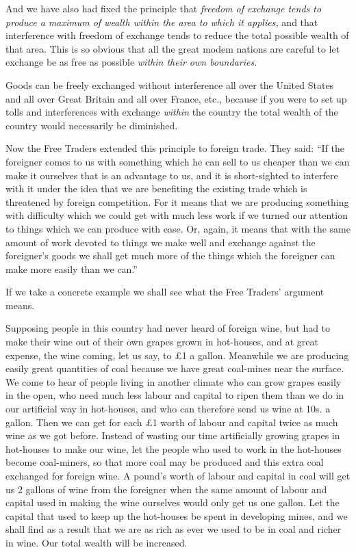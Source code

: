 \documentclass{book}
\begin{document}
And we have also had fixed the principle that \emph{freedom of exchange tends to produce a maximum of wealth within the area to which it applies,} and that interference with freedom of exchange tends to reduce the total possible wealth of that area. This is so obvious that all the great modem nations are careful to let exchange be as free as possible \emph{within their own boundaries.}

Goods can be freely exchanged without interference all over the United States and all over Great Britain and all over France, etc., because if you were to set up tolls and interferences with exchange \emph{within} the country the total wealth of the country would necessarily be diminished.

Now the Free Traders extended this principle to foreign trade. They said: “If the foreigner comes to us with something which he can sell to us cheaper than we can make it ourselves that is an advantage to us, and it is short-sighted to interfere with it under the idea that we are benefiting the existing trade which is threatened by foreign competition. For it means that we are producing something with difficulty which we could get with much less work if we turned our attention to things which we can produce with ease. Or, again, it means that with the same amount of work devoted to things we make well and exchange against the foreigner’s goods we shall get much more of the things which the foreigner can make more easily than we can.”

If we take a concrete example we shall see what the Free Traders’ argument means.

Supposing people in this country had never heard of foreign wine, but had to make their wine out of their own grapes grown in hot-houses, and at great expense, the wine coming, let us say, to £1 a gallon. Meanwhile we are producing easily great quantities of coal because we have great coal-mines near the surface. We come to hear of people living in another climate who can grow grapes easily in the open, who need much less labour and capital to ripen them than we do in our artificial way in hot-houses, and who can therefore send us wine at 10s. a gallon. Then we can get for each £1 worth of labour and capital twice as much wine as we got before. Instead of wasting our time artificially growing grapes in hot-houses to make our wine, let the people who used to work in the hot-houses become coal-miners, so that more coal may be produced and this extra coal exchanged for foreign wine. A pound’s worth of labour and capital in coal will get us 2 gallons of wine from the foreigner when the same amount of labour and capital used in making the wine ourselves would only get us one gallon. Let the capital that used to keep up the hot-houses be spent in developing mines, and we shall find as a result that we are as rich as ever we used to be in coal and richer in wine. Our total wealth will be increased.
\end{document}
